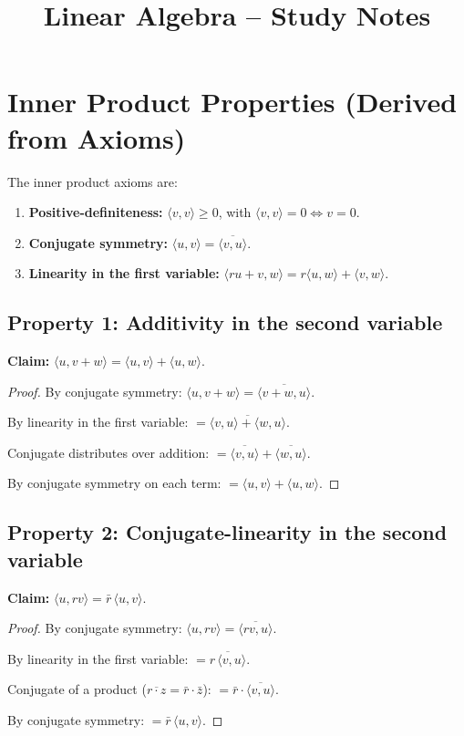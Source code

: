 \documentclass[12pt]{article}
\title{Linear Algebra -- Study Notes}
\author{}
\date{}
\begin{document}
\maketitle

\section{Inner Product Properties (Derived from Axioms)}

The inner product axioms are:
\begin{enumerate}
    \item \textbf{Positive-definiteness:} $\langle v, v \rangle \ge 0$, with $\langle v, v \rangle = 0 \iff v = 0$.
    \item \textbf{Conjugate symmetry:} $\langle u, v \rangle = \overline{\langle v, u \rangle}$.
    \item \textbf{Linearity in the first variable:} $\langle ru + v, w \rangle = r\langle u, w \rangle + \langle v, w \rangle$.
\end{enumerate}

\subsection{Property 1: Additivity in the second variable}

\textbf{Claim:} $\langle u, v+w \rangle = \langle u, v \rangle + \langle u, w \rangle$.

\begin{proof}
By conjugate symmetry:
$\langle u, v+w \rangle = \overline{\langle v+w, u \rangle}$.

By linearity in the first variable:
$= \overline{\langle v, u \rangle + \langle w, u \rangle}$.

Conjugate distributes over addition:
$= \overline{\langle v, u \rangle} + \overline{\langle w, u \rangle}$.

By conjugate symmetry on each term:
$= \langle u, v \rangle + \langle u, w \rangle$.
\end{proof}

\subsection{Property 2: Conjugate-linearity in the second variable}

\textbf{Claim:} $\langle u, rv \rangle = \bar{r}\,\langle u, v \rangle$.

\begin{proof}
By conjugate symmetry:
$\langle u, rv \rangle = \overline{\langle rv, u \rangle}$.

By linearity in the first variable:
$= \overline{r\,\langle v, u \rangle}$.

Conjugate of a product ($\overline{r \cdot z} = \bar{r} \cdot \bar{z}$):
$= \bar{r} \cdot \overline{\langle v, u \rangle}$.

By conjugate symmetry:
$= \bar{r}\,\langle u, v \rangle$.
\end{proof}
\end{document}

